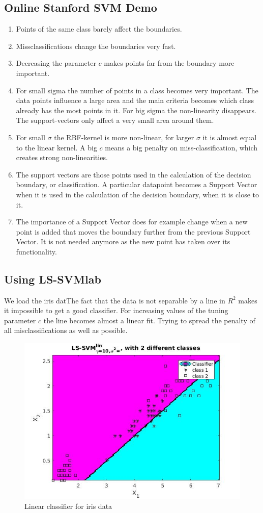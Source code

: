 \documentclass[•]{article}
\begin{document}
\subsection{Online Stanford SVM Demo}
\begin{enumerate}
\item Points of the same class barely affect the boundaries. 
\item Missclassifications change the boundaries very fast. 
\item Decreasing the parameter $c$ makes points far from the boundary more important. 
\item For small sigma the number of points in a class becomes very important. The data points influence a large area and the main criteria becomes which class already has the most points in it. For big sigma the non-linearity disappears. The support-vectors only affect a very small area around them.
\item For small $\sigma$ the RBF-kernel is more non-linear, for larger $\sigma$ it is almost equal to the linear kernel. A big $c$ means a big penalty on miss-classification, which creates strong non-linearities.
\item The support vectors are those points used in the calculation of the decision boundary, or classification. A particular datapoint becomes a Support Vector when it is used in the calculation of the decision boundary, when it is close to it. 
\item The importance of a Support Vector does for example change when a new point is added that moves the boundary further from the previous Support Vector. It is not needed anymore as the new point has taken over its functionality. 
\end{enumerate}

\subsection{Using LS-SVMlab}
We load the iris datThe fact that the data is not separable by a line in $R^2$ makes it impossible to get a good classifier. For increasing values of the tuning parameter $c$ the line becomes almost a linear fit. Trying to spread the penalty of all misclassifications as well as possible.


\begin{figure}[h!]
\centering
\includegraphics[width=.5\textwidth]{13figlin.jpg}
\caption{Linear classifier for iris data}
\end{figure}
\end{document}
